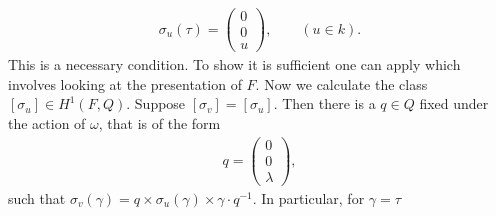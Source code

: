 \begin{align*}
	\sigma_u(\tau) = \left(\begin{matrix} 0 \\ 0 \\ u \end{matrix} \right),\qquad (u\in k).
\end{align*}
This is a necessary condition. To show it is sufficient one can apply \cite[Proposition 2]{martin2004nonab} which involves looking at the presentation of $F$.
Now we calculate the class $[\sigma_u] \in H^1(F, Q)$. Suppose $[\sigma_v] = [\sigma_u]$. Then
there is a $q\in Q$ fixed under the action of $\omega$, that is of the form
\begin{align*}
	q = \left(\begin{matrix} 0 \\ 0 \\ \lambda\end{matrix}\right),
\end{align*}
such that $\sigma_v(\gamma) = q\times\sigma_u(\gamma)\times\gamma\cdot q^{-1}$. In particular, for $\gamma = \tau$
